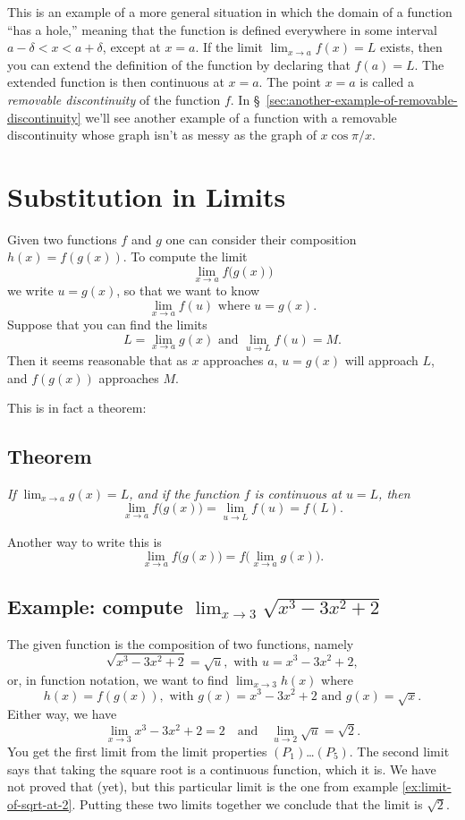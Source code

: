 This is an example of a more general situation in which the domain of
a function ``has a hole,'' meaning that the function is defined
everywhere in some interval $a-\delta <x < a+\delta$, except at $x=a$.
If the limit $\lim_{x\to a} f(x) = L$ exists, then you can extend the
definition of the function by declaring that $f(a) = L$.  The extended
function is then continuous at $x=a$.  The point $x=a$ is called a
\emph{removable discontinuity} of the function $f$.  In
\S~\ref{sec:another-example-of-removable-discontinuity} we'll see
another example of a function with a removable discontinuity whose
graph isn't as messy as the graph of $x\cos\pi/x$.


\section{Substitution in Limits}
\label{sec:substitution-in-limits} Given
two functions $f$ and $g$ one can consider their composition $h(x) = f(g(x))$.
To compute the limit
\[
\lim_{x\to a} f\bigl(g(x)\bigr)
\]
we write $u=g(x)$, so that we want to know
\[
\lim_{x\to a}f(u) \text{ where }u=g(x).
\]
Suppose that you can find the limits
\[
L = \lim_{x\to a} g(x)\text{ and } \lim_{u\to L} f(u) = M.
\]
Then it seems reasonable that as $x$ approaches $a$, $u=g(x)$ will approach
$L$, and $f(g(x))$ approaches $M$.

This is in fact a theorem:

\subsection{Theorem}
\label{thm:substitution}%
\itshape%
If $\lim_{x\to a}g(x) = L$, and if the function $f$ is continuous at $u=L$,
then
\[
\lim_{x\to a}f\bigl(g(x)\bigr) = \lim_{u\to L}f(u) = f(L).
\]\upshape

Another way to write this is
\[
\lim_{x\to a}f\bigl(g(x)\bigr) = f\bigl(\lim_{x\to a}g(x)\bigr).
\]

\subsection{Example: compute $\lim_{x\to3}\sqrt{x^3-3x^2+2}$}
The given function is the composition of two functions, namely
\[
\sqrt{x^3-3x^2+2} = \sqrt u, \text{ with } u = x^3-3x^2+2,
\]
or, in function notation, we want to find $\lim_{x\to 3}h(x)$ where
\[
h(x) = f(g(x)), \text{ with } g(x) = x^3-3x^2+2\text{ and }g(x) = \sqrt{x}.
\]
Either way, we have
\[
\lim_{x\to 3}x^3-3x^2+2 = 2\quad\text{and}\quad \lim_{u\to 2}\sqrt u =
\sqrt 2.
\]
You get the first limit from the limit properties $(P_1)$\ldots$(P_5)$.
The second limit says that taking the square root is a continuous function,
which it is. We have not proved that (yet), but this particular limit is
the one from example \ref{ex:limit-of-sqrt-at-2}.  Putting these two limits
together we conclude that the limit is $\sqrt2$.

